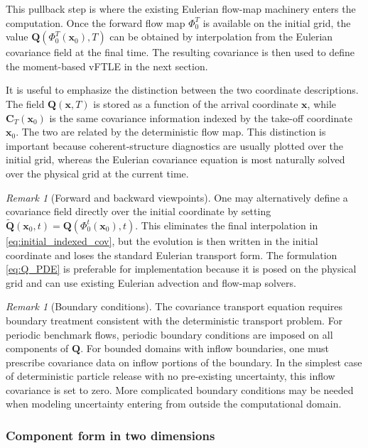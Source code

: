 \documentclass[a4paper,11pt]{article}
\numberwithin{equation}{section}
\theoremstyle{plain}
\theoremstyle{definition}
\theoremstyle{remark}
\newtheorem{remark}[theorem]{Remark}
\newcommand{\bx}{\mathbf{x}}
\newcommand{\bC}{\mathbf{C}}
\newcommand{\bQ}{\mathbf{Q}}
\newcommand{\flow}[2]{\Phi_{#1}^{#2}}
\begin{document}
This pullback step is where the existing Eulerian flow-map machinery enters the computation.  Once the forward flow map \(\flow{0}{T}\) is available on the initial grid, the value \(\bQ(\flow{0}{T}(\bx_0),T)\) can be obtained by interpolation from the Eulerian covariance field at the final time.  The resulting covariance is then used to define the moment-based vFTLE in the next section.

It is useful to emphasize the distinction between the two coordinate descriptions.  The field \(\bQ(\bx,T)\) is stored as a function of the arrival coordinate \(\bx\), while \(\bC_T(\bx_0)\) is the same covariance information indexed by the take-off coordinate \(\bx_0\).  The two are related by the deterministic flow map.  This distinction is important because coherent-structure diagnostics are usually plotted over the initial grid, whereas the Eulerian covariance equation is most naturally solved over the physical grid at the current time.

\begin{remark}[Forward and backward viewpoints]
One may alternatively define a covariance field directly over the initial coordinate by setting \(\widetilde{\bQ}(\bx_0,t)=\bQ(\flow{0}{t}(\bx_0),t)\).  This eliminates the final interpolation in \eqref{eq:initial_indexed_cov}, but the evolution is then written in the initial coordinate and loses the standard Eulerian transport form.  The formulation \eqref{eq:Q_PDE} is preferable for implementation because it is posed on the physical grid and can use existing Eulerian advection and flow-map solvers.
\end{remark}

\begin{remark}[Boundary conditions]
The covariance transport equation requires boundary treatment consistent with the deterministic transport problem.  For periodic benchmark flows, periodic boundary conditions are imposed on all components of \(\bQ\).  For bounded domains with inflow boundaries, one must prescribe covariance data on inflow portions of the boundary.  In the simplest case of deterministic particle release with no pre-existing uncertainty, this inflow covariance is set to zero.  More complicated boundary conditions may be needed when modeling uncertainty entering from outside the computational domain.
\end{remark}

\subsubsection{Component form in two dimensions}
\end{document}
